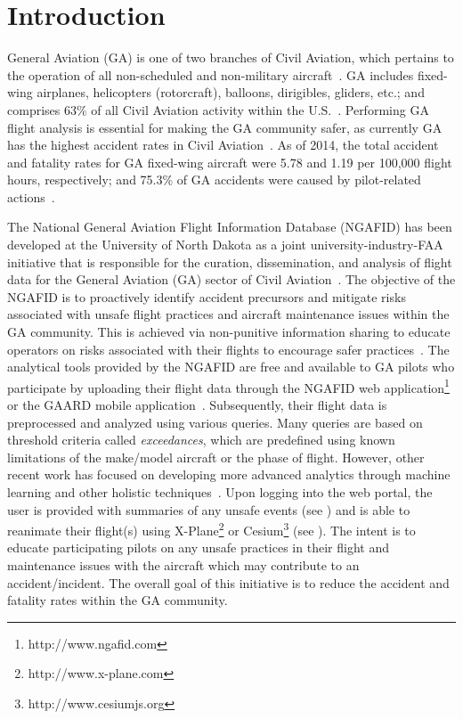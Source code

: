 
\chapter{Introduction} \label{ch:introduction}

	General Aviation (GA) is one of two branches of Civil Aviation, which pertains to the operation of all non-scheduled and non-military aircraft~\cite{aopa2009what,allen2006general,federal-aviation-administration2016the-economic,kenny201726th}.  GA includes fixed-wing airplanes, helicopters (rotorcraft), balloons, dirigibles, gliders, etc.; and comprises 63\% of all Civil Aviation activity within the U.S.~\cite{aopa2009what,federal-aviation-administration2016the-economic,shetty2012current}.  Performing GA flight analysis is essential for making the GA community safer, as currently GA has the highest accident rates in Civil Aviation~\cite{kenny201726th,aopa-air-safety-institute20172015-2016}.  As of 2014, the total accident and fatality rates for GA fixed-wing aircraft were 5.78 and 1.19 per 100,000 flight hours, respectively; and 75.3\% of GA accidents were caused by pilot-related actions~\cite{kenny201726th}.

	The National General Aviation Flight Information Database (NGAFID) has been developed at the University of North Dakota as a joint university-industry-FAA initiative that is responsible for the curation, dissemination, and analysis of flight data for the General Aviation (GA) sector of Civil Aviation~\cite{clacharlarge-scale,url_ngafid}.  The objective of the NGAFID is to proactively identify accident precursors and mitigate risks associated with unsafe flight practices and aircraft maintenance issues within the GA community.  This is achieved via non-punitive information sharing to educate operators on risks associated with their flights to encourage safer practices~\cite{clacharlarge-scale}.  The analytical tools provided by the NGAFID are free and available to GA pilots who participate by uploading their flight data through the NGAFID web application\footnote{http://www.ngafid.com} or the GAARD mobile application~\cite{url_gaard}.  Subsequently, their flight data is preprocessed and analyzed using various queries.  Many queries are based on threshold criteria called \textit{exceedances}, which are predefined using known limitations of the make/model aircraft or the phase of flight. However, other recent work has focused on developing more advanced analytics through machine learning and other holistic techniques~\cite{sophine2014identifying,sophine2016phd,desell2015evolving,elsaid2016vibration,elsaid2016thesis,desell2014evolving}.  Upon logging into the web portal, the user is provided with summaries of any unsafe events (see ) and is able to reanimate their flight(s) using X-Plane\footnote{http://www.x-plane.com} or Cesium\footnote{http://www.cesiumjs.org} (see ).  The intent is to educate participating pilots on any unsafe practices in their flight and maintenance issues with the aircraft which may contribute to an accident/incident. The overall goal of this initiative is to reduce the accident and fatality rates within the GA community.

